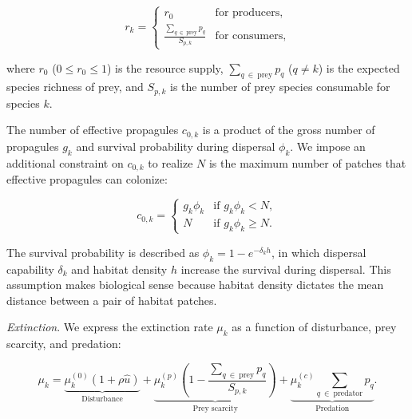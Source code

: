 \documentclass[11pt, class=article, crop=false]{standalone}
\begin{document}
\begin{equation}
    r_{k} = 
    \begin{cases}
        r_0 & \text{for producers,}\\
        \frac{\sum_{q~\in~\text{prey}} p_{q}}{S_{p,k}} & \text{for consumers,}
    \end{cases}
\end{equation}

where $r_0$ ($0 \le r_0 \le 1$) is the resource supply, $\sum_{q~\in~\text{prey}} p_{q}$ ($q \ne k$) is the expected species richness of prey, and $S_{p,k}$ is the number of prey species consumable for species $k$.

The number of effective propagules $c_{0,k}$ is a product of the gross number of propagules $g_k$ and survival probability during dispersal $\phi_k$.
We impose an additional constraint on $c_{0,k}$ to realize $N$ is the maximum number of patches that effective propagules can colonize:

\begin{equation}
    c_{0, k} = 
    \begin{cases}
        g_k \phi_k & \text{if $g_k \phi_k < N$},\\
        N & \text{if $g_k \phi_k \ge N$}.
    \end{cases}
    \label{eq:c0-prod}
\end{equation}

The survival probability is described as $\phi_k = 1 - e^{-\delta_k h}$, in which dispersal capability $\delta_k$ and habitat density $h$ increase the survival during dispersal.
This assumption makes biological sense because habitat density dictates the mean distance between a pair of habitat patches.

\textit{Extinction}. We express the extinction rate $\mu_k$ as a function of disturbance, prey scarcity, and predation:

\begin{equation}
    \mu_{k} = 
        \underbrace{\mu_{k}^{(0)} (1 + \rho \hat{u})}_{\text{Disturbance}} + 
        \underbrace{\mu_{k}^{(p)} \left(1 - \frac{\sum_{q~\in~\text{prey}} p_{q}}{S_{p, k}} \right)}_{\text{Prey scarcity}} + 
        \underbrace{\mu_{k}^{(c)} \sum_{q~\in~\text{predator}} p_{q}}_{\text{Predation}}.
    \label{eq:extn}    
\end{equation}
\end{document}
